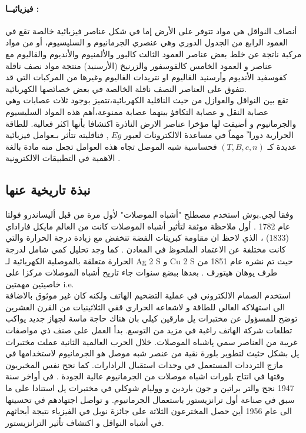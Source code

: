 \paragraph{فيزيائيــا :}
أنصاف النواقل هي مواد تتوفر على الأرض إما في شكل عناصر فيزيائية خالصة تقع في العمود الرابع من الجدول الدوري وهي عنصري الجرمانيوم و السليسيوم، أو من مواد مركبة ناتجة عن خلط بعض عناصر العمود الثالث كالبور والألمنيوم والأنديوم والقاليوم مع عناصر و العمود الخامس كالفوسفور والزرنيخ 
(الأرسنيد) منتجة مواد نصف ناقلة كفوسفيد الأنديوم وأرسنيد الغاليوم او نتريدات الغاليوم وغيرها من المركبات التي قد تتفوق على العناصر النصف ناقلة الخالصة في بعض خصائصها الكهربائية.\\
تقع بين النواقل والعوازل من حيث الناقلية الكهربائية،تتميز بوجود ثلاث عصابات وهي عصابة النقل و عصابة التكافؤ بينهما عصابة ممنوعة،أهم هذه المواد السليسيوم والجرمانيوم و أضيفت لها مؤخرا عناصر الارض الناذرة اكتشافا بأنها اكثر فعالية. للطاقة الحرارية دورا ً مهماً في مساعدة الالكترونات لعبور $ Eg  $ , فناقليته تتأثر بـعوامل فيزيائية عديدة كـ $ ( T,B,c,n ) $ فحساسية شبه الموصل تجاه هذه العوامل تجعل منه مادة بالغة الاهمية في التطبيقات الالكترونية .

\subsection{نبذة تاريخية عنها }

وفقا لجي.بوش   استخدم مصطلح "أشباه الموصلات" لأول مرة من قبل أليساندرو فولتا عام 1782 .
أول ملاحظة موثقة لتأثير أشباه الموصلات كانت من العالم مايكل فاراداي (1833) ، الذي لاحظ ان مقاومة كبريتات الفضة تنخفض مع زيادة درجة الحرارة  والتي كانت مختلفة عن الاعتماد  الملحوظ في المعادن .
كما وجد تحليل كمي شامل لدرجة الحرارة متعلقة بالموصلية الكهربائية لـ Ag 2 S و Cu 2 S حيث تم نشره عام 1851 من طرف يوهان هيتورف . بعدها ببضع سنوات جاء تاريخ أشباه الموصلات مركزا على خاصيتين مهمتين i.e.\\ \cite{a5}
استخدم الصمام الالكتروني في عملية التضخيم الهاتف ولكنه كان غير موثوق بالاضافة الى استهلاكه العالي للطاقة و لاشعاعه الحراري قفي الثلاثينيات من القرن العشرين توضح للمسؤول عن مختبرات پل مارقين كيلي بان هناك حاجة ماسة لجهاز جديد يواكب تطلعات شركة الهاتف راغبة في مزيد من التوسع. بدأ العمل على صنف ذي مواصفات غريبة من العناصر سمي پاشباه الموصلات. خلال الحرب العالمية الثانية عملت مختبرات پل بشكل حثيث لتطوير بلورة نقية من عنصر شبه موصل هو الجرمانيوم لاستخدامها في مازج الترددات المستعمل في وحدات استقبال الرادارات. كما نجح نفس المخبريون وقتها في انتاج بلورات اشباه موصلات من الجرمانيوم عالية الجودة .
في أواخر سنة 1947 نجح والتر براتين و جون باردين و ووليام شوكلي في مختبرات پل استنادا على ما سبق في صناعة أول ترانزيستور باستعمال الجرمانيوم.
و تواصل اجتهادهم في تحسينها الى عام 1956 أين حصل المخترعون الثلاثة على جائزة نوبل في الفيزياء نتيجة أبحاثهم في أشباه النواقل و اكتشاف تأثير الترانزيستور. \cite{a6}

